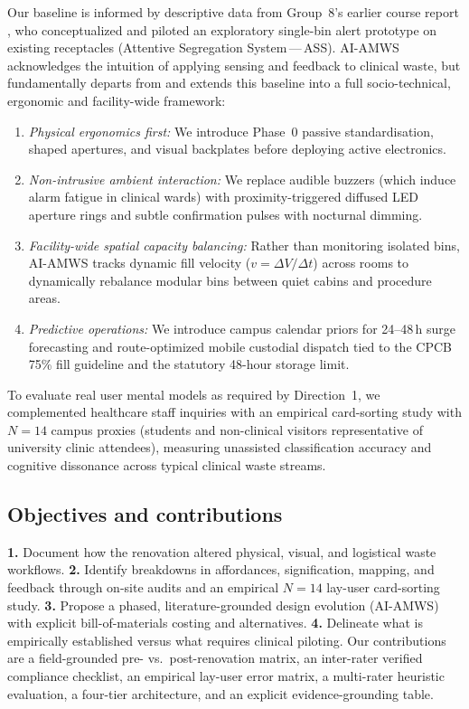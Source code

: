 \documentclass[10pt,twocolumn,a4paper]{article}
\begin{document}
Our baseline is informed by descriptive data from Group~8's earlier course report \cite{g8report}, who conceptualized and piloted an exploratory single-bin alert prototype on existing receptacles (Attentive Segregation System\,---\,ASS). AI-AMWS acknowledges the intuition of applying sensing and feedback to clinical waste, but fundamentally departs from and extends this baseline into a full socio-technical, ergonomic and facility-wide framework:
\begin{enumerate}
\item \emph{Physical ergonomics first:} We introduce Phase~0 passive standardisation, shaped apertures, and visual backplates before deploying active electronics.
\item \emph{Non-intrusive ambient interaction:} We replace audible buzzers (which induce alarm fatigue in clinical wards) with proximity-triggered diffused LED aperture rings and subtle confirmation pulses with nocturnal dimming.
\item \emph{Facility-wide spatial capacity balancing:} Rather than monitoring isolated bins, AI-AMWS tracks dynamic fill velocity ($v=\Delta V/\Delta t$) across rooms to dynamically rebalance modular bins between quiet cabins and procedure areas.
\item \emph{Predictive operations:} We introduce campus calendar priors for 24--48\,h surge forecasting and route-optimized mobile custodial dispatch tied to the CPCB 75\% fill guideline and the statutory 48-hour storage limit.
\end{enumerate}

To evaluate real user mental models as required by Direction~1, we complemented healthcare staff inquiries with an empirical card-sorting study with $N=14$ campus proxies (students and non-clinical visitors representative of university clinic attendees), measuring unassisted classification accuracy and cognitive dissonance across typical clinical waste streams.

\subsection{Objectives and contributions}
\textbf{1.} Document how the renovation altered physical, visual, and logistical waste workflows. \textbf{2.} Identify breakdowns in affordances, signification, mapping, and feedback through on-site audits and an empirical $N=14$ lay-user card-sorting study. \textbf{3.} Propose a phased, literature-grounded design evolution (AI-AMWS) with explicit bill-of-materials costing and alternatives. \textbf{4.} Delineate what is empirically established versus what requires clinical piloting. Our contributions are a field-grounded pre- vs.\ post-renovation matrix, an inter-rater verified compliance checklist, an empirical lay-user error matrix, a multi-rater heuristic evaluation, a four-tier architecture, and an explicit evidence-grounding table.
\end{document}
